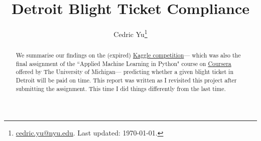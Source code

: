 \documentclass[12pt,letterpaper]{article}
\numberwithin{equation}{section}
\begin{document}
\renewcommand{\Im}{{\rm Im}\,}
\renewcommand{\Re}{{\rm Re}\,}
\newcommand{\diag}{{\rm diag} \, }
\newcommand{\Tr}{{\rm Tr}\,}
\newcommand{\tr}{{\rm tr}\,}
\newcommand{\C}{{\mathcal{C}}}

\title{\vspace{-2.5cm}\color{PineGreen}\textbf{Detroit Blight Ticket Compliance}}
\date{} %
\author{Cedric Yu\footnote{\href{mailto:cedric.yu@nyu.edu}{cedric.yu@nyu.edu}. Last updated: \today.}}
\maketitle
\vspace{-1cm}
\begin{abstract}
We summarise our findings on the (expired) \href{https://www.kaggle.com/c/detroit-blight-ticket-compliance/overview}{Kaggle competition}--- which was also the final assignment of the ``Applied Machine Learning in Python" course on \href{https://www.coursera.org/learn/python-machine-learning}{Coursera} offered by The University of Michigan--- predicting whether a given blight ticket in Detroit will be paid on time. This report was written as I revisited this project after submitting the assignment. This time I did things differently from the last time.
\end{abstract}




\end{document}
